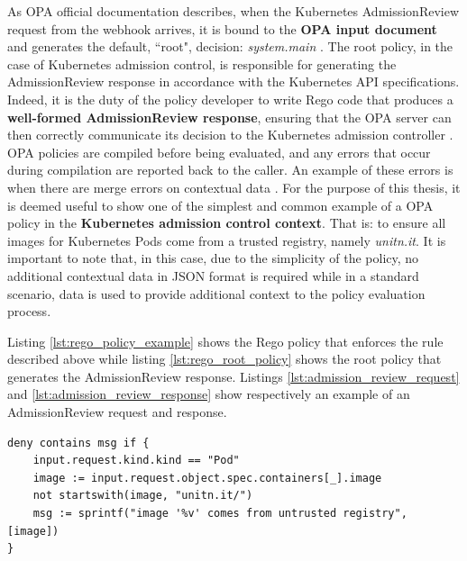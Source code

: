 
As OPA official documentation describes, when the Kubernetes AdmissionReview request from the webhook arrives, it is bound to the \textbf{OPA input document} and generates the default, ``root", decision: \textit{system.main} \cite{opa_docs}.
The root policy, in the case of Kubernetes admission control, is responsible for generating the AdmissionReview response in accordance with the Kubernetes API specifications. 
Indeed, it is the duty of the policy developer to write Rego code that produces a \textbf{well-formed AdmissionReview response}, ensuring that the OPA server can then correctly communicate its decision to the Kubernetes admission controller \cite{opa_docs}.
OPA policies are compiled before being evaluated, and any errors that occur during compilation are reported back to the caller.
An example of these errors is when there are merge errors on contextual data \cite{opa_docs}.
For the purpose of this thesis, it is deemed useful to show one of the simplest and common example of a OPA policy in the \textbf{Kubernetes admission control context}. 
That is: to ensure all images for Kubernetes Pods come from a trusted registry, namely \textit{unitn.it}.
It is important to note that, in this case, due to the simplicity of the policy, no additional contextual data in JSON format is required while in a standard scenario, data is used to provide additional context to the policy evaluation process. \newline

Listing \ref{lst:rego_policy_example} shows the Rego policy that enforces the rule described above while listing \ref{lst:rego_root_policy} shows the root policy that generates the AdmissionReview response.
Listings \ref{lst:admission_review_request} and \ref{lst:admission_review_response} show respectively an example of an AdmissionReview request and response. \newline

\begin{lstlisting}[language=Rego, caption={Rego policy for Pods registry}, label=lst:rego_policy_example]                              
deny contains msg if {                                                      
    input.request.kind.kind == "Pod"                                        
    image := input.request.object.spec.containers[_].image                  
    not startswith(image, "unitn.it/")                                     
    msg := sprintf("image '%v' comes from untrusted registry", [image])     
}
\end{lstlisting}

